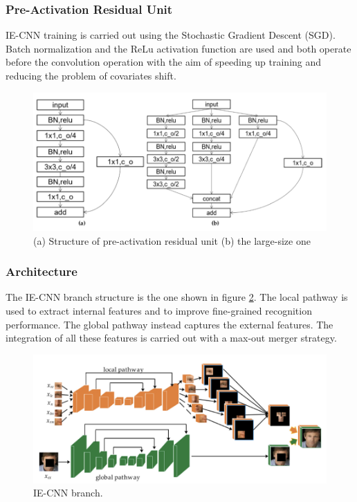 \subsubsection{Pre-Activation Residual Unit}
IE-CNN training is carried out using the Stochastic Gradient Descent (SGD). 
Batch normalization and the ReLu activation function are used and both 
operate before the convolution operation with the aim of speeding up training 
and reducing the problem of covariates shift.
\begin{figure}[h!]
    \centering
    \includegraphics[width = 0.8\linewidth]{images/paper9/architecture.png}
    \centering
    \caption{(a) Structure of pre-activation residual unit (b) the large-size one}
    \label{fig:ResidualUnit}
\end{figure}

\subsubsection{Architecture}
The IE-CNN branch structure is the one shown in figure \ref{fig:IE-CNN ARCHITECTURE}. The local pathway 
is used to extract internal features and to improve fine-grained recognition 
performance. The global pathway instead captures the external features. 
The integration of all these features is carried out with a max-out merger 
strategy.
\begin{figure}[h!]
    \centering
    \includegraphics[width = 0.8\linewidth]{images/paper9/IE-CNN.png}
    \centering
    \caption{IE-CNN branch.}
    \label{fig:IE-CNN ARCHITECTURE}
\end{figure}

